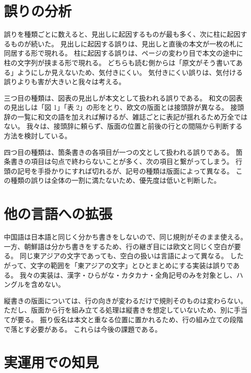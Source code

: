 \documentclass[10pt,a4paper,twocolumn]{article}
\newcommand{\s}[1]{#1}
\begin{document}
\section{誤りの分析}

\s{誤りを種類ごとに数えると、見出しに起因するものが最も多く、次に柱に起因するものが続いた。}%
\s{見出しに起因する誤りは、見出しと直後の本文が一枚の札に同居する形で現れる。}%
\s{柱に起因する誤りは、ページの変わり目で本文の途中に柱の文字列が挟まる形で現れる。}%
\s{どちらも読む側からは「原文がそう書いてある」ようにしか見えないため、気付きにくい。}%
\s{気付きにくい誤りは、気付ける誤りよりも害が大きいと我々は考える。}%

\s{三つ目の種類は、図表の見出しが本文として扱われる誤りである。}%
\s{和文の図表の見出しは「図 1」「表 2」の形をとり、欧文の版面とは接頭辞が異なる。}%
\s{接頭辞の一覧に和文の語を加えれば解けるが、雑誌ごとに表記が揺れるため万全ではない。}%
\s{我々は、接頭辞に頼らず、版面の位置と前後の行との間隔から判断する方法を検討している。}%

\s{四つ目の種類は、箇条書きの各項目が一つの文として扱われる誤りである。}%
\s{箇条書きの項目は句点で終わらないことが多く、次の項目と繋がってしまう。}%
\s{行頭の記号を手掛かりにすれば切れるが、記号の種類は版面によって異なる。}%
\s{この種類の誤りは全体の一割に満たないため、優先度は低いと判断した。}%

\section{他の言語への拡張}

\s{中国語は日本語と同じく分かち書きをしないので、同じ規則がそのまま使える。}%
\s{一方、朝鮮語は分かち書きをするため、行の継ぎ目には欧文と同じく空白が要る。}%
\s{同じ東アジアの文字であっても、空白の扱いは言語によって異なる。}%
\s{したがって、文字の範囲を「東アジアの文字」とひとまとめにする実装は誤りである。}%
\s{我々の実装は、漢字・ひらがな・カタカナ・全角記号のみを対象とし、ハングルを含めない。}%

\s{縦書きの版面については、行の向きが変わるだけで規則そのものは変わらない。}%
\s{ただし、版面から行を組み立てる処理は縦書きを想定していないため、別に手当てが要る。}%
\s{振り仮名は本文と重なる位置に置かれるため、行の組み立ての段階で落とす必要がある。}%
\s{これらは今後の課題である。}%

\section{実運用での知見}
\end{document}
